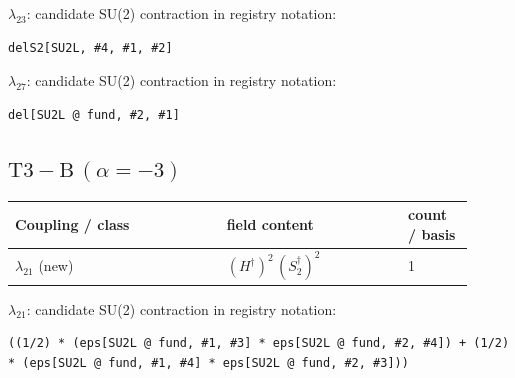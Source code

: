 \documentclass[9pt,a4paper]{article}
\begin{document}
\textbf{$ \lambda_{23} $}: candidate SU(2) contraction in registry notation:
\begin{lstlisting}[mathescape=true]
delS2[SU2L, #4, #1, #2]
\end{lstlisting}

\textbf{$ \lambda_{27} $}: candidate SU(2) contraction in registry notation:
\begin{lstlisting}[mathescape=true]
del[SU2L @ fund, #2, #1]
\end{lstlisting}

\subsection*{$ \mathrm{T3-B}\,(\alpha=-3) $}
\begin{longtable}{@{}p{0.42\linewidth}p{0.36\linewidth}p{0.13\linewidth}@{}}
\toprule
Coupling / class & field content & count / basis\\
\midrule
\endhead
$\lambda_{21}$ (new) & $\left(H^\dagger\right)^{2}\, \left(S_2^\dagger\right)^{2}$ & 1 \\
\bottomrule
\end{longtable}
\textbf{$ \lambda_{21} $}: candidate SU(2) contraction in registry notation:
\begin{lstlisting}[mathescape=true]
((1/2) * (eps[SU2L @ fund, #1, #3] * eps[SU2L @ fund, #2, #4]) + (1/2) * (eps[SU2L @ fund, #1, #4] * eps[SU2L @ fund, #2, #3]))
\end{lstlisting}
\end{document}
